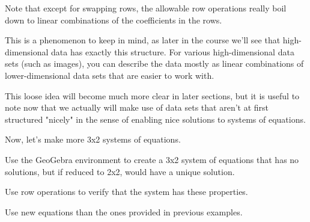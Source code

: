 \documentclass{ximera}
\begin{document}
    \begin{remark}
    
        Note that except for swapping rows, the allowable row operations really boil down to linear combinations of the coefficients in the rows.
    
        This is a phenomenon to keep in mind, as later in the course we'll see that high-dimensional data has exactly this structure. For various high-dimensional data sets (such as images), you can describe the data mostly as linear combinations of lower-dimensional data sets that are easier to work with. 
        
        This loose idea will become much more clear in later sections, but it is useful to note now that we actually will make use of data sets that aren't at first structured "nicely" in the sense of enabling nice solutions to systems of equations.
    
    \end{remark}
    
    Now, let's make more 3x2 systems of equations.
    
    \begin{example}
    
        Use the GeoGebra environment to create a 3x2 system of equations that has no solutions, but if reduced to 2x2, would have a unique solution.
    
        Use row operations to verify that the system has these properties.
    
        Use new equations than the ones provided in previous examples. 
    \end{example}
    
\end{document}
